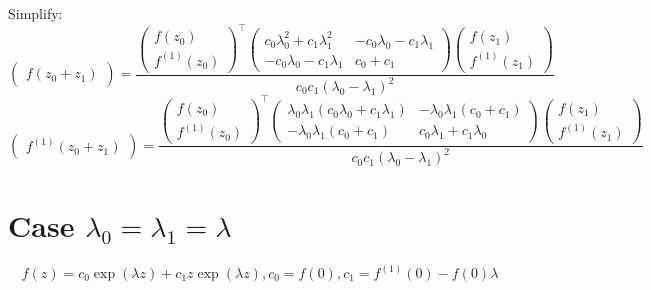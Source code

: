 \documentclass[]{article}
\newcommand{\pqty}[1]{{\left(#1\right)}}
\numberwithin{equation}{section}
\begin{document}
	Simplify:
	\begin{equation}
		\begin{pmatrix}
			f\pqty{z_0+z_1}
		\end{pmatrix}
		=\frac{
		\begin{pmatrix}
			f\pqty{z_0} \\
			f^\pqty{1}\pqty{z_0}
		\end{pmatrix}^\top
		\begin{pmatrix}
			c_0 \lambda_0^2+c_1 \lambda_1^2 & -c_0 \lambda_0-c_1 \lambda_1 \\
			-c_0 \lambda_0-c_1 \lambda_1 & c_0 +c_1
		\end{pmatrix}
		\begin{pmatrix}
			f\pqty{z_1} \\
			f^\pqty{1}\pqty{z_1}
		\end{pmatrix}}{c_0 c_1 \pqty{\lambda_0-\lambda_1}^2}
	\end{equation}
	\begin{equation}
		\begin{pmatrix}
			f^\pqty{1}\pqty{z_0+z_1}
		\end{pmatrix}
		=\frac{
		\begin{pmatrix}
			f\pqty{z_0} \\
			f^\pqty{1}\pqty{z_0}
		\end{pmatrix}^\top
		\begin{pmatrix}
			\lambda_0 \lambda_1\pqty{c_0 \lambda_0+c_1 \lambda_1} & -\lambda_0 \lambda_1 \pqty{c_0+c_1} \\
			-\lambda_0 \lambda_1 \pqty{c_0+c_1} & c_0 \lambda_1+c_1\lambda_0
		\end{pmatrix}
		\begin{pmatrix}
			f\pqty{z_1} \\
			f^\pqty{1}\pqty{z_1}
		\end{pmatrix}}{c_0 c_1 \pqty{\lambda_0-\lambda_1}^2}
	\end{equation}
	
	\section{Case $\lambda_0=\lambda_1=\lambda$}
	\begin{equation}
		f\pqty{z}=c_0 \exp\pqty{\lambda z}+c_1 z \exp\pqty{\lambda z},
		c_0=f\pqty{0},
		c_1=f^\pqty{1}\pqty{0}-f\pqty{0}\lambda
	\end{equation}
	
\end{document}
